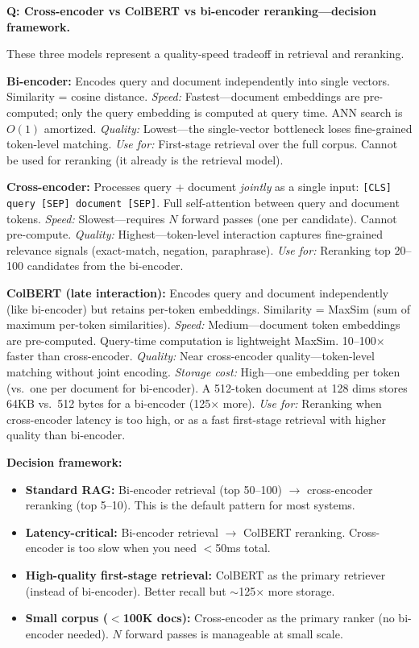 \begin{interviewq}
\textbf{Q: Cross-encoder vs ColBERT vs bi-encoder reranking---decision framework.}

 \quad {} \quad \badgefreq{\freqmed}

\stronganswer

These three models represent a quality-speed tradeoff in retrieval and reranking.

\textbf{Bi-encoder:} Encodes query and document independently into single vectors. Similarity = cosine distance. \textit{Speed:} Fastest---document embeddings are pre-computed; only the query embedding is computed at query time. ANN search is $O(1)$ amortized. \textit{Quality:} Lowest---the single-vector bottleneck loses fine-grained token-level matching. \textit{Use for:} First-stage retrieval over the full corpus. Cannot be used for reranking (it already is the retrieval model).

\textbf{Cross-encoder:} Processes query + document \textit{jointly} as a single input: \texttt{[CLS] query [SEP] document [SEP]}. Full self-attention between query and document tokens. \textit{Speed:} Slowest---requires $N$ forward passes (one per candidate). Cannot pre-compute. \textit{Quality:} Highest---token-level interaction captures fine-grained relevance signals (exact-match, negation, paraphrase). \textit{Use for:} Reranking top 20--100 candidates from the bi-encoder.

\textbf{ColBERT (late interaction):} Encodes query and document independently (like bi-encoder) but retains per-token embeddings. Similarity = MaxSim (sum of maximum per-token similarities). \textit{Speed:} Medium---document token embeddings are pre-computed. Query-time computation is lightweight MaxSim. 10--100$\times$ faster than cross-encoder. \textit{Quality:} Near cross-encoder quality---token-level matching without joint encoding. \textit{Storage cost:} High---one embedding per token (vs.\ one per document for bi-encoder). A 512-token document at 128 dims stores 64KB vs.\ 512 bytes for a bi-encoder (125$\times$ more). \textit{Use for:} Reranking when cross-encoder latency is too high, or as a fast first-stage retrieval with higher quality than bi-encoder.

\textbf{Decision framework:}
\begin{itemize}
    \item \textbf{Standard RAG:} Bi-encoder retrieval (top 50--100) $\rightarrow$ cross-encoder reranking (top 5--10). This is the default pattern for most systems.
    \item \textbf{Latency-critical:} Bi-encoder retrieval $\rightarrow$ ColBERT reranking. Cross-encoder is too slow when you need $<$50ms total.
    \item \textbf{High-quality first-stage retrieval:} ColBERT as the primary retriever (instead of bi-encoder). Better recall but $\sim$125$\times$ more storage.
    \item \textbf{Small corpus ($<$100K docs):} Cross-encoder as the primary ranker (no bi-encoder needed). $N$ forward passes is manageable at small scale.
\end{itemize}


\end{interviewq}
